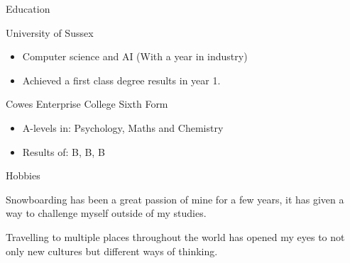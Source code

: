 \documentclass[]{article}
\newlength{\tabin}
\newlength{\secsep}
\newcommand{\lineunder}{\vspace*{-8pt} \\ \hspace*{-6pt} \hrulefill \\ \vspace*{-15pt}}
\newenvironment{tabbedsection}[1]{
  \begin{list}{}{
      \setlength{\itemsep}{0pt}
      \setlength{\labelsep}{0pt}
      \setlength{\labelwidth}{0pt}
      \setlength{\leftmargin}{\tabin}
      \setlength{\rightmargin}{\tabin}
      \setlength{\listparindent}{0pt}
      \setlength{\parsep}{0pt}
      \setlength{\parskip}{0pt}
      \setlength{\partopsep}{0pt}
      \setlength{\topsep}{#1}
    }
  \item[]
}{\end{list}}
\newenvironment{resume_section}[1]{
  \filbreak
  \vspace{2\secsep}
  \textsc{\large#1}
  \lineunder
  \begin{tabbedsection}{\secsep}
}{\end{tabbedsection}}
\newenvironment{resume_subsection}[2][]{
  \textbf{#2} \hfill {\footnotesize #1} \hspace{2em}
  \begin{tabbedsection}{0.5\secsep}
}{\end{tabbedsection}}
\newenvironment{subitems}{
  \renewcommand{\labelitemi}{-}
  \begin{itemize}
      \setlength{\labelsep}{1em}
}{\end{itemize}}
\begin{document}
\begin{resume_section}{Education}
  \begin{resume_subsection}{University of Sussex}
    \begin{subitems}
      \item Computer science and AI (With a year in industry)
      \item Achieved a first class degree results in year 1.
    \end{subitems}
  \end{resume_subsection}
  
  \begin{resume_subsection}{Cowes Enterprise College Sixth Form}
    \begin{subitems}
      \item A-levels in: Psychology, Maths and Chemistry
      \item Results of: B, B, B
     \end{subitems}
  \end{resume_subsection}
\end{resume_section}

\begin{resume_section}{Hobbies}
  \begin{resume_subsection}
   \item Snowboarding has been a great passion of mine for a few years, it has given a way to challenge myself outside of my studies.
   \item Travelling to multiple places throughout the world has opened my eyes to not only new cultures but different ways of thinking.
  \end{resume_subsection}
\end{resume_section}
\end{document}
